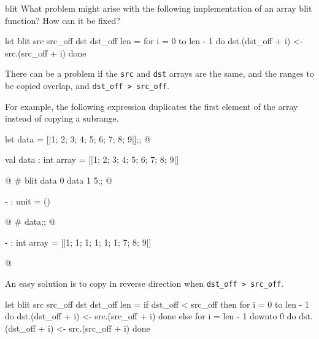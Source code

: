 %
\begin{exercise}{blit}
What problem might arise with the following implementation of an array blit function?
How can it be fixed?

\begin{ocaml}
let blit src src_off dst dst_off len =
   for i = 0 to len - 1 do
      dst.(dst_off + i) <- src.(src_off + i)
   done
\end{ocaml}

\begin{answer}\ifanswers
There can be a problem if the \hbox{\lstinline/src/} and \hbox{\lstinline/dst/} arrays are the same,
and the ranges to be copied overlap, and \hbox{\lstinline/dst_off > src_off/}.

For example, the following expression duplicates the first element of the array
instead of copying a subrange.

\begin{ocaml}
let data = [|1; 2; 3; 4; 5; 6; 7; 8; 9|];;
@
\begin{topoutput}
val data : int array = [|1; 2; 3; 4; 5; 6; 7; 8; 9|]
\end{topoutput}
@
# blit data 0 data 1 5;;
@
\begin{topoutput}
- : unit = ()
\end{topoutput}
@
# data;;
@
\begin{topoutput}
- : int array = [|1; 1; 1; 1; 1; 1; 7; 8; 9|]
\end{topoutput}
@
\end{ocaml}
%
An easy solution is to copy in reverse direction when \hbox{\lstinline/dst_off > src_off/}.

\begin{ocaml}
let blit src src_off dst dst_off len =
   if dst_off < src_off then
      for i = 0 to len - 1 do
         dst.(dst_off + i) <- src.(src_off + i)
      done
   else
      for i = len - 1 downto 0 do
         dst.(dst_off + i) <- src.(src_off + i)
      done
\end{ocaml}
\fi\end{answer}
\end{exercise}

